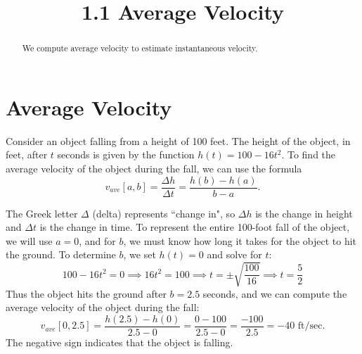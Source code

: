 \documentclass[handout]{ximera}
\title{1.1 Average Velocity}
\begin{document}
\begin{abstract}
We compute average velocity to estimate instantaneous velocity.
\end{abstract}

\maketitle


\section{Average Velocity}
\begin{example}[Example 1]
Consider an object falling from a height of 100 feet. The height of the object, in feet, after $t$ seconds is given by the function $h(t)= 100 - 16t^2$.
To find the average velocity of the object during the fall, we can use the formula
\[
v_{ave}[a,b] = \frac{\Delta h}{\Delta t} = \frac{h(b) - h(a)}{b-a}.
\]

The Greek letter $\Delta$ (delta) represents ``change in", so $\Delta h$ is the change in 
height and $\Delta t$ is the change in time. 
To represent the entire 100-foot fall of the object, 
we will use $a = 0$, and for $b$, we must know how long it takes for the object to hit the ground. To determine $b$, we set $h(t) = 0$ and solve for $t$:
\[100-16t^2 = 0 \implies 16t^2 = 100 \implies t = \pm \sqrt{\frac{100}{16}} \implies t = \frac52\]
Thus the object hits the ground after $ b = 2.5$ seconds, and we can compute the average velocity of the object 
during the fall:
\[v_{ave}[0, 2.5] = \frac{h(2.5) - h(0)}{2.5 - 0} = \frac{0 - 100}{2.5 - 0} = \frac{-100}{2.5} = -40 \text{ ft/sec}.\] 
The negative sign indicates that the object is falling.
\end{example}
\end{document}
